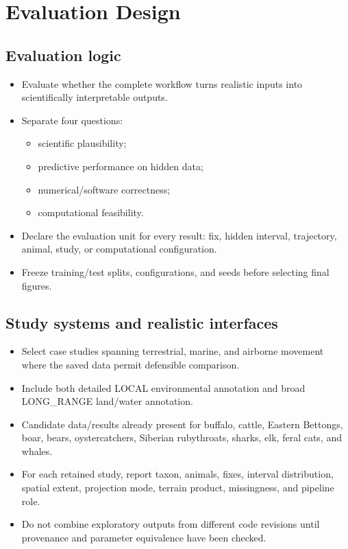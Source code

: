 \chapter{Evaluation Design}
\label{chap:evaluation}

\section{Evaluation logic}

\begin{itemize}
  \item Evaluate whether the complete workflow turns realistic inputs into scientifically interpretable outputs.
  \item Separate four questions:
  \begin{itemize}
    \item scientific plausibility;
    \item predictive performance on hidden data;
    \item numerical/software correctness;
    \item computational feasibility.
  \end{itemize}
  \item Declare the evaluation unit for every result: fix, hidden interval, trajectory, animal, study, or computational configuration.
  \item Freeze training/test splits, configurations, and seeds before selecting final figures.
\end{itemize}

\section{Study systems and realistic interfaces}

\begin{itemize}
  \item Select case studies spanning terrestrial, marine, and airborne movement where the saved data permit defensible comparison.
  \item Include both detailed LOCAL environmental annotation and broad LONG\_RANGE land/water annotation.
  \item Candidate data/results already present for buffalo, cattle, Eastern Bettongs, boar, bears, oystercatchers, Siberian rubythroats, sharks, elk, feral cats, and whales.
  \item For each retained study, report taxon, animals, fixes, interval distribution, spatial extent, projection mode, terrain product, missingness, and pipeline role.
  \item Do not combine exploratory outputs from different code revisions until provenance and parameter equivalence have been checked.
\end{itemize}

